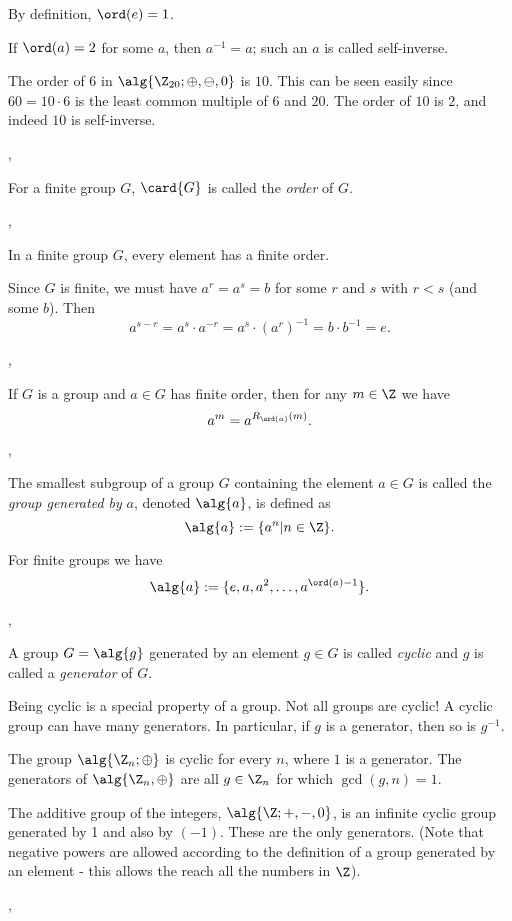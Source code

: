 By definition, $\ord(e)=1$.

If $\ord(a)=2$ for some $a$, then $a^{-1}=a$; such
an $a$ is called self-inverse.

\Ex The order of $6$ in $\alg{\Z_{20};\oplus,\ominus,0}$ is $10$. This can be
seen easily since $60=10\cdot 6$ is the least common multiple of $6$ and $20$.
The order of $10$ is $2$, and indeed $10$ is self-inverse.

\sep

 For a finite group $G$, $\card{G}$ is called the \emph{order} of 
$G$.

\sep

 In a finite group $G$, every element has a finite order.

\Proof Since $G$ is finite, we must have $a^{r}=a^{s}=b$ for some $r$ and $s$
with $r<s$ (and some $b$). Then
\[
a^{s-r}=a^s\cdot a^{-r}=a^s\cdot (a^{r})^{-1} = b \cdot b^{-1} = e.
\]

\sep

\Lem{*} If $G$ is a group and $a\in G$ has finite order, then for any $m\in \Z$
we have
\[
a^{m}=a^{R_{\ord(a)}(m)}.
\]

\sep

 The smallest subgroup of a group $G$ containing the element $a\in G$
is called the \emph{group generated by} $a$, denoted $\alg{a}$, is defined as
\[
\alg{a}:=\{a^n|n\in\Z\}.
\]

\Com For finite groups we have
\[
\alg{a}:=\{e,a,a^2,\ldots,a^{\ord(a)-1}\}.
\]

\sep

 A group $G=\alg{g}$ generated by an element $g\in G$ is called
\emph{cyclic} and $g$ is called a \emph{generator} of $G$.

\Com Being cyclic is a special property of a group. Not all groups are
cyclic! A cyclic group can have many generators. In particular, if $g$ is a
generator, then so is $g^{-1}$.

\Ex The group $\alg{\Z_n;\oplus}$ is cyclic for every $n$, where $1$ is a
generator. The generators of $\alg{\Z_n,\oplus}$ are all $g\in\Z_n$ for which
$\gcd(g,n)=1$.

\Ex The additive group of the integers, $\alg{\Z;+,-,0}$, is an infinite cyclic
group generated by 1 and also by $(-1)$. These are the only generators. (Note
that negative powers are allowed according to the definition of a group
generated by an element - this allows the reach all the numbers in $\Z$).

\sep

